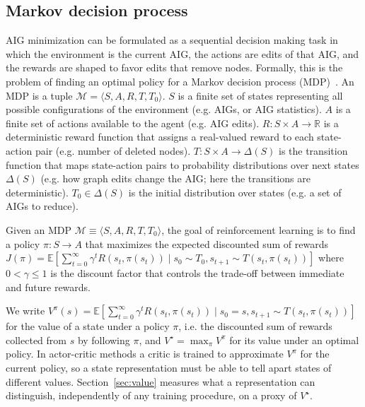 \documentclass{article}
\begin{document}
\subsection{Markov decision process}\label{sec:mdp-bg}
AIG minimization can be formulated as a sequential decision making task in which the environment is the current AIG, the actions are edits of that AIG, and the rewards are shaped to favor edits that remove nodes.
Formally, this is the problem of finding an optimal policy for a Markov decision process (MDP)~\cite{Bellman,puterman}.
An MDP is a tuple $\mathcal{M} = \langle S, A, R, T, T_0 \rangle$.
$S$ is a finite set of states representing all possible configurations of the environment (e.g. AIGs, or AIG statistics).
$A$ is a finite set of actions available to the agent (e.g. AIG edits).
$R: S \times A \rightarrow \mathbb{R}$ is a deterministic reward function that assigns a real-valued reward to each state-action pair (e.g. number of deleted nodes).
$T: S \times A \rightarrow \Delta(S)$ is the transition function that maps state-action pairs to probability distributions over next states $\Delta(S)$ (e.g. how graph edits change the AIG; here the transitions are deterministic).
$T_0 \in \Delta(S)$ is the initial distribution over states (e.g. a set of AIGs to reduce).

Given an MDP $\mathcal{M}\equiv\langle S, A, R, T, T_0 \rangle$, the goal of reinforcement learning is to find a policy $\pi: S \rightarrow A$ that maximizes the expected discounted sum of rewards {\small$J(\pi) = \mathbb{E}\left[\sum_{t=0}^{\infty} \gamma^t R(s_t, \pi(s_t)) \mid s_0 \sim T_0, s_{t+1} \sim T(s_t, \pi(s_t))\right]$}
where $0< \gamma\leq 1$ is the discount factor that controls the trade-off between immediate and future rewards.

We write $V^\pi(s)=\mathbb{E}\left[\sum_{t=0}^{\infty} \gamma^t R(s_t, \pi(s_t)) \mid s_0 = s, s_{t+1} \sim T(s_t, \pi(s_t))\right]$ for the value of a state under a policy $\pi$, i.e. the discounted sum of rewards collected from $s$ by following $\pi$, and $V^\star = \max_\pi V^\pi$ for its value under an optimal policy.
In actor-critic methods a critic is trained to approximate $V^\pi$ for the current policy, so a state representation must be able to tell apart states of different values.
Section~\ref{sec:value} measures what a representation can distinguish, independently of any training procedure, on a proxy of $V^\star$.
\end{document}

